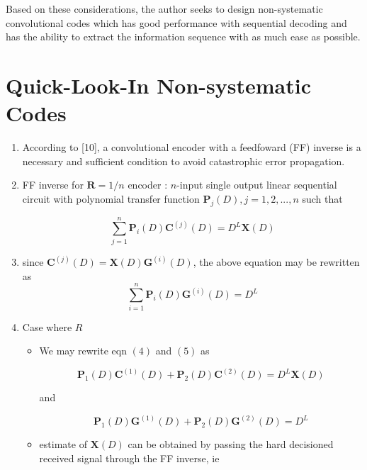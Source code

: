 \documentclass[fontsize=12pt]{article}
\begin{document}
Based on these considerations, the author seeks to design non-systematic convolutional codes which has good performance with sequential decoding and has the ability to extract the information sequence with as much ease as possible. 

\section{Quick-Look-In Non-systematic Codes}
\begin{enumerate}
\item According to [10], a convolutional encoder with a feedfoward (FF) inverse is a necessary and sufficient condition to avoid catastrophic error propagation.

\item FF inverse for $\mathbf{R}=1/n$ encoder : $n$-input single output linear sequential circuit with polynomial transfer function $\mathbf{\mathbf{P}}_j(D), j=1,2,...,n$ such that 

\begin{equation}
\sum_{j=1}^{n} \mathbf{\mathbf{P}}_i(D)\mathbf{C}^{(j)}(D) = D^L\mathbf{X}(D)
\end{equation}

\item since $\mathbf{C}^{(j)}(D)=\mathbf{X}(D)\mathbf{\mathbf{G}}^{(i)}(D)$, the above equation may be rewritten as 
\begin{equation}
\sum_{i=1}^{n} \mathbf{\mathbf{P}}_i(D)\mathbf{\mathbf{G}}^{(i)}(D) = D^L
\end{equation}

\item Case where $R$
\begin{itemize}
\item We may rewrite eqn $(4)$ and $(5)$ as

\begin{equation}
\mathbf{\mathbf{P}}_1(D)\mathbf{C}^{(1)}(D) +\mathbf{\mathbf{P}}_2(D)\mathbf{C}^{(2)}(D)= D^L\mathbf{X}(D)
\end{equation}

and

\begin{equation}
\mathbf{\mathbf{P}}_1(D)\mathbf{G}^{(1)}(D) + \mathbf{\mathbf{P}}_2(D)\mathbf{G}^{(2)}(D)= D^L
\end{equation}

\item estimate of $\mathbf{X}(D)$ can be obtained by passing the hard decisioned received signal through the FF inverse, ie


\end{itemize}
\end{enumerate}
\end{document}
